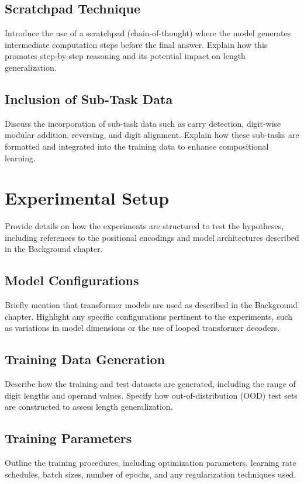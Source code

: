\subsection{Scratchpad Technique}
Introduce the use of a scratchpad (chain-of-thought) where the model generates intermediate computation steps before the final answer. Explain how this promotes step-by-step reasoning and its potential impact on length generalization.

\subsection{Inclusion of Sub-Task Data}
Discuss the incorporation of sub-task data such as carry detection, digit-wise modular addition, reversing, and digit alignment. Explain how these sub-tasks are formatted and integrated into the training data to enhance compositional learning.

\section{Experimental Setup}
\label{sec:experimental_setup}
Provide details on how the experiments are structured to test the hypotheses, including references to the positional encodings and model architectures described in the Background chapter.

\subsection{Model Configurations}
Briefly mention that transformer models are used as described in the Background chapter. Highlight any specific configurations pertinent to the experiments, such as variations in model dimensions or the use of looped transformer decoders.

\subsection{Training Data Generation}
Describe how the training and test datasets are generated, including the range of digit lengths and operand values. Specify how out-of-distribution (OOD) test sets are constructed to assess length generalization.

\subsection{Training Parameters}
Outline the training procedures, including optimization parameters, learning rate schedules, batch sizes, number of epochs, and any regularization techniques used.

